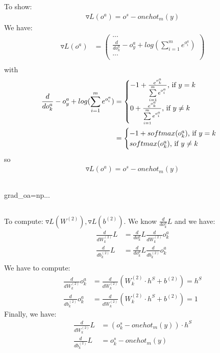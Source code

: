 \documentclass[12pt]{article}
\begin{document}
\subsection{}
To show:
\begin{align}
\label{grad_oa}
\triangledown L({o^a}) = o^s-onehot_m(y)
\end{align}
We have: 
\begin{align*}
\triangledown L({o^a}) & = \begin{pmatrix}
... \\
\frac{d}{do^a_k} -o^a_y+log(\sum\limits_{i=1}^m e^{o^a_i}) \\
... \\
\end{pmatrix} \\
\end{align*}
with
\begin{align*}
\frac{d}{do^a_k} -o^a_y+log(\sum\limits_{i=1}^m e^{o^a_i}) & = \begin{cases}
               -1+\frac{e^{o^a_k}}{\sum\limits_{i=1}^m e^{o^a_i}}$, if $ y = k \\
               0+\frac{e^{o^a_k}}{\sum\limits_{i=1}^m e^{o^a_i}}$, if $ y \neq k \\
            \end{cases} \\
            & = \begin{cases}
               -1+ softmax(o^a_k)$, if $ y = k \\
               softmax(o^a_k)$, if $ y \neq k \\
            \end{cases} \\
\end{align*}
so \begin{align*}
\triangledown L({o^a}) = o^s-onehot_m(y)
\end{align*}
\subsection{}
grad\_oa=np...
\subsection{}
To compute: $\triangledown L(W^{(2)}), \triangledown L(b^{(2)})$.
We know $\frac{d}{do^a_k} L$ and we have:
\begin{align*}
\frac{d}{dW^{(2)}_{k}} L &= \frac{d}{do^a_k} L \frac{d}{dW^{(2)}_{k}} o^a_k \\
\frac{d}{db^{(2)}_{k}} L &= \frac{d}{do^a_k} L \frac{d}{db^{(2)}_{k}} o^a_k \\
\end{align*}
We have to compute:
\begin{align*}
\frac{d}{dW^{(2)}_{k}} o^a_k & = \frac{d}{dW^{(2)}_{k}} (W^{(2)}_{k} \cdot h^S + b^{(2)}) = h^S \\
\frac{d}{db^{(2)}_{k}} o^a_k &= \frac{d}{dW^{(2)}_{k}} (W^{(2)}_{k} \cdot h^S + b^{(2)}) = 1
\end{align*}
Finally, we have:
\begin{align*}
\frac{d}{dW^{(2)}_{k}} L & = (o^s_k-onehot_m(y)) \cdot h^S \\
\frac{d}{db^{(2)}_{k}} L & = o^s_k-onehot_m(y)
\end{align*}
\end{document}
